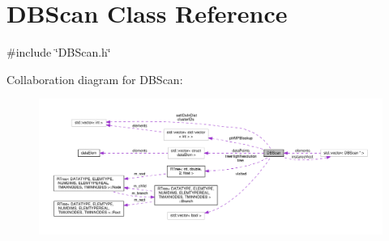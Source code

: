 \hypertarget{classDBScan}{\section{D\-B\-Scan Class Reference}
\label{classDBScan}
}


{\ttfamily \#include \char`\"{}D\-B\-Scan.\-h\char`\"{}}



Collaboration diagram for D\-B\-Scan\-:\nopagebreak
\begin{figure}[H]
\begin{center}
\leavevmode
\includegraphics[width=350pt]{classDBScan__coll__graph}
\end{center}
\end{figure}
